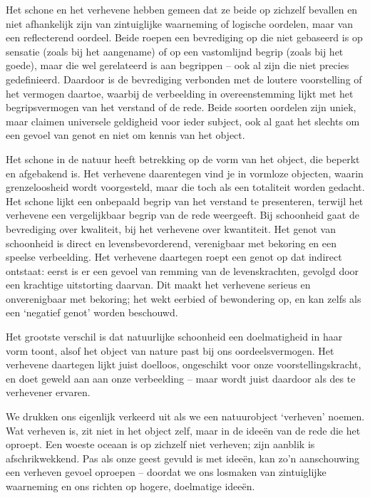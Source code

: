 \begin{mdframed}[leftmargin=0pt,rightmargin=0pt,backgroundcolor=blue!6,linecolor=white,innertopmargin=6pt,innerbottommargin=6pt]

Het schone en het verhevene hebben gemeen dat ze beide op zichzelf bevallen en niet afhankelijk zijn van zintuiglijke waarneming of logische oordelen, maar van een reflecterend oordeel. Beide roepen een bevrediging op die niet gebaseerd is op sensatie (zoals bij het aangename) of op een vastomlijnd begrip (zoals bij het goede), maar die wel gerelateerd is aan begrippen – ook al zijn die niet precies gedefinieerd. Daardoor is de bevrediging verbonden met de loutere voorstelling of het vermogen daartoe, waarbij de verbeelding in overeenstemming lijkt met het begripsvermogen van het verstand of de rede.
Beide soorten oordelen zijn uniek, maar claimen universele geldigheid voor ieder subject, ook al gaat het slechts om een gevoel van genot en niet om kennis van het object.

Het schone in de natuur heeft betrekking op de vorm van het object, die beperkt en afgebakend is. Het verhevene daarentegen vind je in vormloze objecten, waarin grenzeloosheid wordt voorgesteld, maar die toch als een totaliteit worden gedacht. Het schone lijkt een onbepaald begrip van het verstand te presenteren, terwijl het verhevene een vergelijkbaar begrip van de rede weergeeft. Bij schoonheid gaat de bevrediging over kwaliteit, bij het verhevene over kwantiteit.
Het genot van schoonheid is direct en levensbevorderend, verenigbaar met bekoring en een speelse verbeelding. Het verhevene daartegen roept een genot op dat indirect ontstaat: eerst is er een gevoel van remming van de levenskrachten, gevolgd door een krachtige uitstorting daarvan. Dit maakt het verhevene serieus en onverenigbaar met bekoring; het wekt eerbied of bewondering op, en kan zelfs als een ‘negatief genot’ worden beschouwd.

Het grootste verschil is dat natuurlijke schoonheid een doelmatigheid in haar vorm toont, alsof het object van nature past bij ons oordeelsvermogen. Het verhevene daartegen lijkt juist doelloos, ongeschikt voor onze voorstellingskracht, en doet geweld aan aan onze verbeelding – maar wordt juist daardoor als des te verhevener ervaren.

We drukken ons eigenlijk verkeerd uit als we een natuurobject ‘verheven’ noemen. Wat verheven is, zit niet in het object zelf, maar in de ideeën van de rede die het oproept. Een woeste oceaan is op zichzelf niet verheven; zijn aanblik is afschrikwekkend. Pas als onze geest gevuld is met ideeën, kan zo’n aanschouwing een verheven gevoel oproepen – doordat we ons losmaken van zintuiglijke waarneming en ons richten op hogere, doelmatige ideeën.


\end{mdframed}
